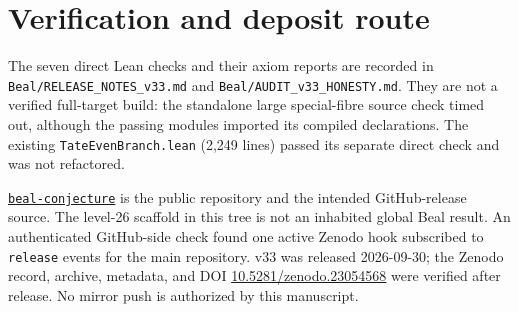 \documentclass[11pt]{article}
\begin{document}
\section{Verification and deposit route}
The seven direct Lean checks and their axiom reports are recorded in
\texttt{Beal/RELEASE\_NOTES\_v33.md} and
\texttt{Beal/AUDIT\_v33\_HONESTY.md}. They are not a verified
full-target build: the standalone large special-fibre source check
timed out, although the passing modules imported its compiled
declarations. The existing \texttt{TateEvenBranch.lean} (2,249
lines) passed its separate direct check and was not refactored.

\href{https://github.com/DavidFox998/beal-conjecture}
{\texttt{beal-conjecture}} is the public repository and the
intended GitHub-release source. The level-26 scaffold in this
tree is not an inhabited global Beal result.
An authenticated GitHub-side check found one active Zenodo hook
subscribed to \texttt{release} events for the main repository.
v33 was released 2026-09-30; the Zenodo record, archive, metadata,
and DOI \href{https://doi.org/10.5281/zenodo.23054568}{10.5281/zenodo.23054568}
were verified after release. No mirror push is authorized
by this manuscript.
\end{document}
